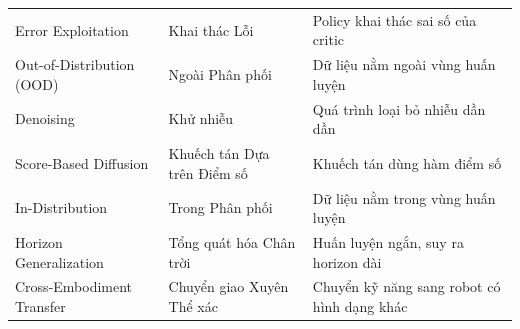 \documentclass[12pt,a4paper]{article}
\begin{document}
\begin{center}
\begin{longtable}{p{5cm} p{4.5cm} p{4.5cm}}
    Error Exploitation & Khai thác Lỗi & Policy khai thác sai số của critic \\
    Out-of-Distribution (OOD) & Ngoài Phân phối & Dữ liệu nằm ngoài vùng huấn luyện \\
    Denoising & Khử nhiễu & Quá trình loại bỏ nhiễu dần dần \\
    Score-Based Diffusion & Khuếch tán Dựa trên Điểm số & Khuếch tán dùng hàm điểm số \\
    In-Distribution & Trong Phân phối & Dữ liệu nằm trong vùng huấn luyện \\
    Horizon Generalization & Tổng quát hóa Chân trời & Huấn luyện ngắn, suy ra horizon dài \\
    Cross-Embodiment Transfer & Chuyển giao Xuyên Thể xác & Chuyển kỹ năng sang robot có hình dạng khác \\
\end{longtable}
\end{center}

\newpage








\newpage


\end{document}
